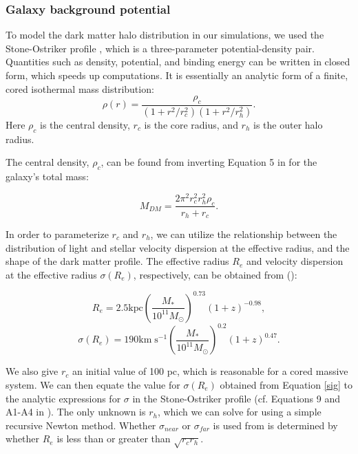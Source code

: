 \documentclass[fleqn,usenatbib,useAMS]{mnras}
\begin{document}
\subsubsection{Galaxy background potential} \label{Galaxy background potential}
To model the dark matter halo distribution in our simulations, we used the Stone-Ostriker profile \citep{2015ApJ...806L..28S}, which is a three-parameter potential-density pair.  Quantities such as density, potential, and binding energy can be written in closed form, which speeds up computations.  It is essentially an analytic form of a finite, cored isothermal mass distribution:
\begin{equation} \label{jerry}
\rho(r) = \frac{\rho_c}{(1+r^2/r_{c}^2)(1+r^2/r_{h}^2)}.
\end{equation}
Here $\rho_c$ is the central density, $r_c$ is the core radius, and $r_h$ is the outer halo radius.

The central density, $\rho_c$, can be found from inverting Equation 5 in  \citet{2015ApJ...806L..28S} for the galaxy's total mass:

\begin{equation} \label{rhoc}
M_{DM} = \frac{2\pi^2r_{c}^2r_{h}^2\rho_c}{r_h+r_c}.
\end{equation}

In order to parameterize $r_c$ and $r_h$, we can utilize the relationship between the distribution of light and stellar velocity dispersion at the effective radius, and the shape of the dark matter profile.  The effective radius $R_{e}$ and velocity dispersion at the effective radius $\sigma(R_e)$, respectively, can be obtained from (\citealt{2009ApJ...706L..86N, 2010ApJ...725.2312O, 2014ApJ...789..156M}):

\begin{equation} \label{re}
R_{e} = 2.5 \mathrm{kpc}\left(\frac{M_*}{10^{11}M_{\odot}}\right)^{0.73}(1+z)^{-0.98},
\end{equation}
\begin{equation} \label{sig}
\sigma(R_{e}) = 190\mathrm{km}\;\mathrm{s}^{-1}\left(\frac{M_{*}}{10^{11}M_{\odot}}\right)^{0.2}(1+z)^{0.47}.
\end{equation}

We also give $r_c$ an initial value of 100 pc, which is reasonable for a cored massive system.  We can then equate the value for $\sigma({R_e})$ obtained from Equation \ref{sig} to the analytic expressions for $\sigma$ in the Stone-Ostriker profile (cf. Equations 9 and A1-A4 in \citealt{2015ApJ...806L..28S}).  The only unknown is $r_h$, which we can solve for using a simple recursive Newton method.  Whether $\sigma_{near}$ or $\sigma_{far}$ is used from \cite{2015ApJ...806L..28S} is determined by whether $R_e$ is less than or greater than $\sqrt{r_c r_h}$.
\end{document}
